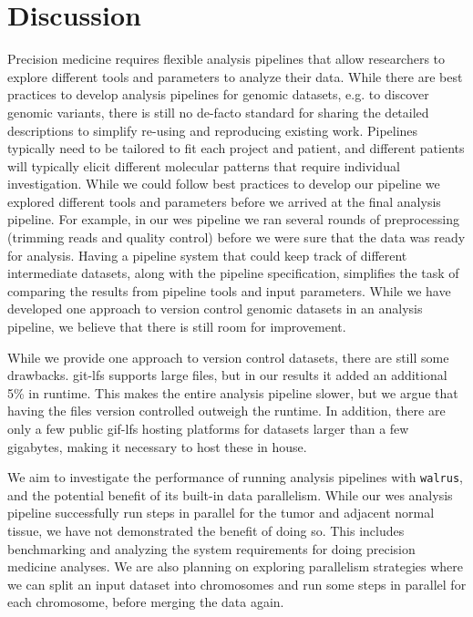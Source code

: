 \section{Discussion}
Precision medicine requires flexible analysis pipelines that allow researchers
to explore different tools and parameters to analyze their data.  While there
are best practices to develop analysis pipelines for genomic datasets, e.g. to
discover genomic variants, there is still no de-facto standard for sharing the
detailed descriptions to simplify re-using and reproducing existing work.
Pipelines typically need to be tailored to fit each project and patient, and
different patients will typically elicit different molecular patterns that
require individual investigation. While we could follow best practices to
develop our pipeline we explored different tools and parameters before we
arrived at the final analysis pipeline.  For example, in our \gls{wes} pipeline
we ran several rounds of preprocessing (trimming reads and quality control)
before we were sure that the data was ready for analysis. Having a pipeline
system that could keep track of different intermediate datasets, along with the
pipeline specification, simplifies the task of comparing the results from
pipeline tools and input parameters. While we have developed one approach to
version control genomic datasets in an analysis pipeline, we believe that there
is still room for improvement. 

While we provide one approach to version control datasets, there are still some
drawbacks. git-lfs supports large files, but in our results it added an
additional 5\% in runtime.  This makes the entire analysis pipeline slower, but
we argue that having the files version controlled outweigh the runtime. In
addition, there are only a few public gif-lfs hosting platforms for datasets
larger than a few gigabytes, making it necessary to host these in house. 

We aim to investigate the performance of running analysis pipelines with
\texttt{walrus}, and the potential benefit of its built-in data parallelism.
While our \gls{wes} analysis pipeline successfully run steps in parallel for the
tumor and adjacent normal tissue, we have not demonstrated the benefit
of doing so. This includes benchmarking and analyzing the system requirements
for doing precision medicine analyses.  We are also planning on exploring
parallelism strategies where we can split an input dataset into chromosomes and
run some steps in parallel for each chromosome, before merging the data again. 

